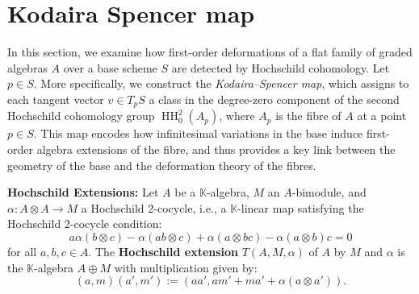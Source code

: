 \documentclass{amsart}
\def\HH{\operatorname{HH}}
\begin{document}
\section{Kodaira Spencer map}

In this section, we examine how first-order deformations of a flat family of graded algebras \( A \) over a base scheme \( S \) are detected by Hochschild cohomology. Let $p \in S$.  More specifically, we construct the \emph{Kodaira–Spencer map}, which assigns to each tangent vector \( v \in T_p S \) a class in the degree-zero component of the second Hochschild cohomology group \( \HH^2_0(A_p) \), where \( A_p \) is the fibre of \( A \) at a point \( p \in S \). This map encodes how infinitesimal variations in the base induce first-order algebra extensions of the fibre, and thus provides a key link between the geometry of the base and the deformation theory of the fibres.

\begin{definition}
\textnormal{\textbf{Hochschild Extensions:} Let $A$ be a $\mathbb{K}$-algebra, $M$ an $A$-bimodule, and \( \alpha: A \otimes A \to M \) a Hochschild 2-cocycle, i.e., a $\mathbb{K}$-linear map satisfying the Hochschild 2-cocycle condition:
\[
    a\alpha(b \otimes c) - \alpha(ab \otimes c) + \alpha(a \otimes bc) - \alpha(a \otimes b)c = 0
\]
for all \( a, b, c \in A \). The \textbf{Hochschild extension} \( T(A, M, \alpha) \) of $A$ by $M$ and $\alpha$ is the $\mathbb{K}$-algebra $A \oplus M$ with multiplication given by:
\[
    (a, m)(a', m') := (aa', am' + ma' + \alpha(a \otimes a')).
\]}
\end{definition}
\end{document}
